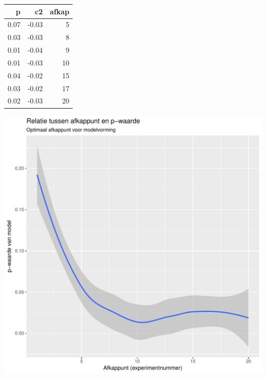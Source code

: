 \documentclass[a1,portrait]{a0poster}
\begin{document}
\begin{multicols}{3}
\begin{tabular}{r r r}
	\hline
	p & c2 & afkap\\
	\hline
	0.07 & -0.03 & 5\\
	0.03 & -0.03 & 8\\
	0.01 & -0.04 & 9\\
	0.01 & -0.03 & 10\\
	0.04 & -0.02 & 15\\
	0.03 & -0.02 & 17\\
	0.02 & -0.03 & 20\\
	\hline
\end{tabular}

\begin{center}\vspace{1cm}
\includegraphics[width=0.8\linewidth]{pwaardes.pdf}
\end{center}\vspace{1cm}


\end{multicols}
\end{document}
